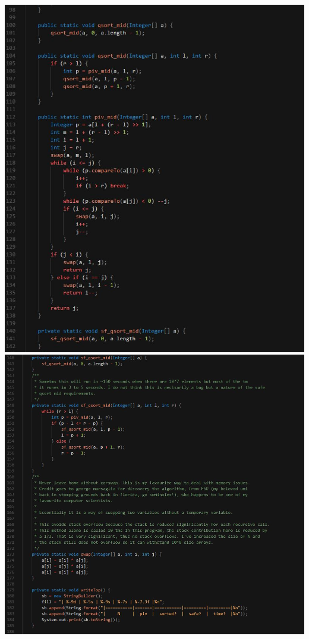 \documentclass[paper=a4,fontsize=11pt]{article}
\begin{document}
\newpage
\includegraphics[width=\linewidth]{code3.jpg}
\newpage
\includegraphics[width=\linewidth]{code4.jpg}
\end{document}
